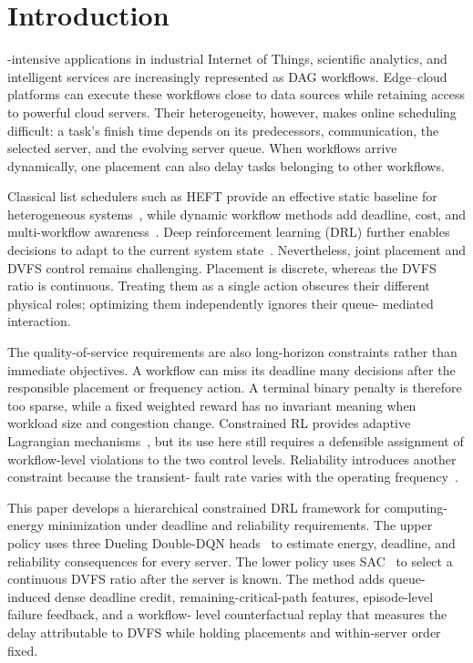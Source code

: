 \documentclass[lettersize,journal]{IEEEtran}
\begin{document}
\section{Introduction}
\label{sec:introduction}

-intensive applications in industrial Internet of Things,
scientific analytics, and intelligent services are increasingly represented as
DAG workflows. Edge--cloud platforms can execute these workflows close to data
sources while retaining access to powerful cloud servers. Their heterogeneity,
however, makes online scheduling difficult: a task's finish time depends on its
predecessors, communication, the selected server, and the evolving server queue.
When workflows arrive dynamically, one placement can also delay tasks belonging
to other workflows.

Classical list schedulers such as HEFT provide an effective static baseline for
heterogeneous systems~\cite{topcuoglu2002}, while dynamic workflow methods add
deadline, cost, and multi-workflow awareness~\cite{arabnejad2019,ismayilov2020}.
Deep reinforcement learning (DRL) further enables decisions to adapt to the
current system state~\cite{jayanetti2022,chen2023,pan2024}. Nevertheless, joint
placement and DVFS control remains challenging. Placement is discrete, whereas
the DVFS ratio is continuous. Treating them as a single action obscures their
different physical roles; optimizing them independently ignores their queue-
mediated interaction.

The quality-of-service requirements are also long-horizon constraints rather
than immediate objectives. A workflow can miss its deadline many decisions
after the responsible placement or frequency action. A terminal binary penalty
is therefore too sparse, while a fixed weighted reward has no invariant meaning
when workload size and congestion change. Constrained RL provides adaptive
Lagrangian mechanisms~\cite{achiam2017,tessler2019,stooke2020}, but its use here
still requires a defensible assignment of workflow-level violations to the two
control levels. Reliability introduces another constraint because the transient-
fault rate varies with the operating frequency~\cite{zhang2017,wu2018,hassan2020}.

This paper develops a hierarchical constrained DRL framework for computing-
energy minimization under deadline and reliability requirements. The upper
policy uses three Dueling Double-DQN heads~\cite{vanhasselt2016,wang2016dueling}
to estimate energy, deadline, and reliability consequences for every server.
The lower policy uses SAC~\cite{haarnoja2018} to select a continuous DVFS ratio
after the server is known. The method adds queue-induced dense deadline credit,
remaining-critical-path features, episode-level failure feedback, and a workflow-
level counterfactual replay that measures the delay attributable to DVFS while
holding placements and within-server order fixed.
\end{document}
